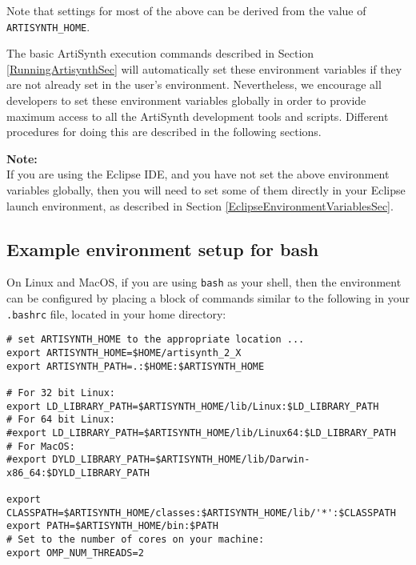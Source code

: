 \documentclass{article}
\begin{document}

Note that settings for most of the above can be derived from the value
of {\tt ARTISYNTH\_HOME}.

The basic ArtiSynth execution commands described in
Section \ref{RunningArtisynthSec} will automatically set these environment
variables if they are not already set in the user's
environment. Nevertheless, we encourage all developers to set these
environment variables globally in order to provide maximum access to
all the ArtiSynth development tools and scripts. Different procedures
for doing this are described in the following sections.

\begin{sideblock}
{\bf Note:}\\
If you are using the Eclipse IDE, and you have not set the
above environment variables globally, then you will need to
set some of them directly in your Eclipse launch environment,
as described in Section \ref{EclipseEnvironmentVariablesSec}.
\end{sideblock}


\subsection{Example environment setup for bash}
\label{bashEnvSec}

On Linux and MacOS, if you are using {\tt bash} as your shell, then the
environment can be configured by placing a block of commands similar
to the following in your {\tt .bashrc} file, located in your home
directory:

\begin{lstlisting}
# set ARTISYNTH_HOME to the appropriate location ...
export ARTISYNTH_HOME=$HOME/artisynth_2_X
export ARTISYNTH_PATH=.:$HOME:$ARTISYNTH_HOME

# For 32 bit Linux:
export LD_LIBRARY_PATH=$ARTISYNTH_HOME/lib/Linux:$LD_LIBRARY_PATH
# For 64 bit Linux:
#export LD_LIBRARY_PATH=$ARTISYNTH_HOME/lib/Linux64:$LD_LIBRARY_PATH
# For MacOS:
#export DYLD_LIBRARY_PATH=$ARTISYNTH_HOME/lib/Darwin-x86_64:$DYLD_LIBRARY_PATH

export CLASSPATH=$ARTISYNTH_HOME/classes:$ARTISYNTH_HOME/lib/'*':$CLASSPATH
export PATH=$ARTISYNTH_HOME/bin:$PATH
# Set to the number of cores on your machine:
export OMP_NUM_THREADS=2 
\end{lstlisting}
\end{document}
